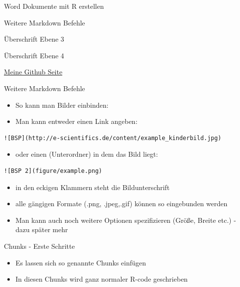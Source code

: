 \documentclass[ignorenonframetext,]{beamer}
\providecommand{\tightlist}{%
\setlength{\itemsep}{0pt}\setlength{\parskip}{0pt}}
\begin{document}
\begin{frame}[fragile]{Word Dokumente mit R erstellen}
\begin{block}{Weitere Markdown Befehle}
\begin{block}{Überschrift Ebene 3}
\begin{block}{Überschrift Ebene 4}

\href{https://github.com/Japhilko}{Meine Github Seite}

\end{block}

\end{block}

\end{block}

\begin{block}{Weitere Markdown Befehle}

\begin{itemize}
\tightlist
\item
  So kann man Bilder einbinden:
\item
  Man kann entweder einen Link angeben:
\end{itemize}

\begin{verbatim}
![BSP](http://e-scientifics.de/content/example_kinderbild.jpg)
\end{verbatim}

\begin{itemize}
\tightlist
\item
  oder einen (Unterordner) in dem das Bild liegt:
\end{itemize}

\begin{verbatim}
![BSP 2](figure/example.png)
\end{verbatim}

\begin{itemize}
\tightlist
\item
  in den eckigen Klammern steht die Bildunterschrift
\item
  alle gängigen Formate (.png, .jpeg,.gif) können so eingebunden werden
\item
  Man kann auch noch weitere Optionen spezifizieren (Größe, Breite etc.)
  - dazu später mehr
\end{itemize}

\end{block}

\begin{block}{Chunks - Erste Schritte}

\begin{itemize}
\tightlist
\item
  Es lassen sich so genannte Chunks einfügen
\item
  In diesen Chunks wird ganz normaler R-code geschrieben
\end{itemize}


\end{block}
\end{frame}
\end{document}
